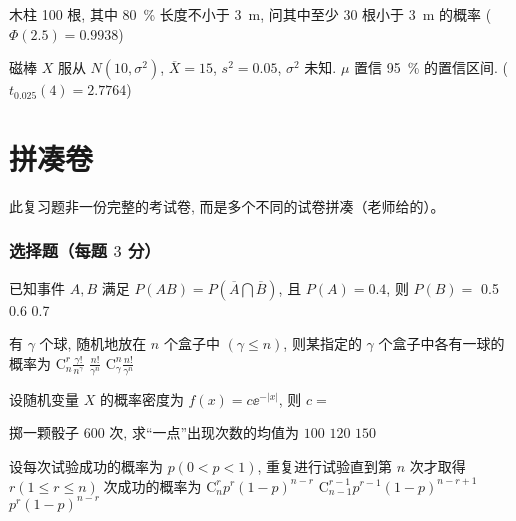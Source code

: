 \begin{ti}
	木柱 100 根, 其中 \SI{80}{\percent} 长度不小于 \SI{3}{m}, 问其中至少 30 根小于 \SI{3}{m} 的概率 ($\Phi(2.5) = 0.9938$)
\end{ti}

\begin{ti}
	磁棒 $X$ 服从 $N(10,\sigma^2)$, $\overline{X} = 15$, $s^2 = 0.05$, $\sigma^2$ 未知. $\mu$ 置信 \SI{95}{\percent} 的置信区间. ($t_{0.025}(4) = 2.7764$)
\end{ti}

\section{拼凑卷}
此复习题非一份完整的考试卷, 而是多个不同的试卷拼凑（老师给的）。

\subsubsection{选择题（每题 $3$ 分）}
\begin{ti}
	已知事件 $A,B$ 满足 $P(AB)=P\left( \overline{A}\bigcap\overline{B} \right)$, 且 $P(A)=0.4$, 则 $P(B)=$ \kuo{}
	{0.5}
	{0.6}
	{0.7}
\end{ti}

\begin{ti}
	有 $\gamma$ 个球, 随机地放在 $n$ 个盒子中 $(\gamma \leqslant n)$, 则某指定的 $\gamma$ 个盒子中各有一球的概率为 \kuo{}
	{$\mathrm{C}_n^r\frac{\gamma !}{n^\gamma}$}
	{$\frac{n!}{\gamma^n}$}
	{$\mathrm{C}_\gamma^n\frac{n!}{\gamma^n}$}
\end{ti}

\begin{ti}
	设随机变量 $X$ 的概率密度为 $f(x)=c\ee^{-\left|x\right|}$, 则 $c=$ \kuo{}
\end{ti}

\begin{ti}
	掷一颗骰子 $600$ 次, 求“一点”出现次数的均值为 \kuo{}
	{$100$}
	{$120$}
	{$150$}
\end{ti}

\begin{ti}
	设每次试验成功的概率为 $p (0<p<1)$, 重复进行试验直到第 $n$ 次才取得 $r (1\leqslant r\leqslant n)$ 次成功的概率为 \kuo{}
	{$\mathrm{C}_{n}^{r}p^r(1-p)^{n-r}$}
	{$\mathrm{C}_{n-1}^{r-1}p^{r-1}(1-p)^{n-r+1}$}
	{$p^r(1-p)^{n-r}$}
\end{ti}


